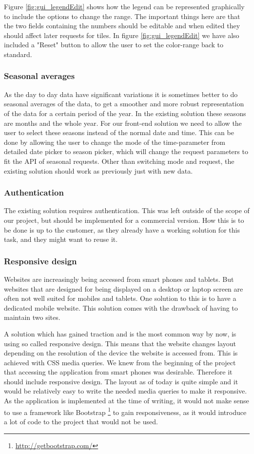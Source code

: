 \documentclass[11pt,a4paper,titlepage,oneside]{report}
\begin{document}
Figure \ref{fig:gui_legendEdit} shows how the legend can be represented graphically to include the options to change the range. The important things here are that the two fields containing the numbers should be editable and when edited they should affect later requests for tiles. In figure \ref{fig:gui_legendEdit} we have also included a "Reset" button to allow the user to set the color-range back to standard.

\subsubsection{Seasonal averages}
As the day to day data have significant variations it is sometimes better to do seasonal averages of the data, to get a smoother and more robust representation of the data for a certain period of the year. In the existing solution these seasons are months and the whole year. For our \gls{front-end} solution we need to allow the user to select these seasons instead of the normal date and time. This can be done by allowing the user to change the mode of the time-parameter from detailed date picker to season picker, which will change the request parameters to fit the API of seasonal requests. Other than switching mode and request, the existing solution should work as previously just with new data.

\subsubsection{Authentication}
The existing solution requires authentication. This was left outside of the scope of our project, but should be implemented for a commercial version. How this is to be done is up to the customer, as they already have a working solution for this task, and they might want to reuse it.

\subsubsection{Responsive design}
Websites are increasingly being accessed from smart phones and tablets. But websites that are designed for being displayed on a desktop or laptop screen are often not well suited for mobiles and tablets. One solution to this is to have a dedicated mobile website. This solution comes with the drawback of having to maintain two sites. 

A solution which has gained traction and is the most common way by now, is using so called responsive design. This means that the website changes layout depending on the resolution of the device the website is accessed from. This is achieved with \gls{CSS} media queries.
We knew from the beginning of the project that accessing the application from smart phones was desirable. Therefore it should include responsive design. The layout as of today is quite simple and it would be relatively easy to write the needed media queries to make it responsive. As the application is implemented at the time of writing, it would not make sense to use a framework like Bootstrap \footnote{\url{http://getbootstrap.com/}} to gain responsiveness, as it would introduce a lot of code to the project that would not be used. 
\end{document}
